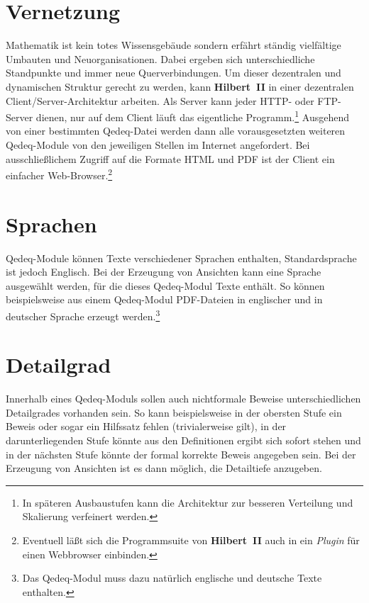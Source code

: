 \documentclass[a4paper,german,10pt,twoside]{book}
\begin{document}
{\section{Vernetzung}
Mathematik ist kein totes Wissensgeb{\"a}ude sondern erf{\"a}hrt st{\"a}ndig vielf{\"a}ltige Umbauten und
Neuorganisationen. Dabei ergeben sich unterschiedliche Standpunkte und immer neue Querverbindungen.
Um dieser dezentralen und dynamischen Struktur gerecht zu werden, kann \textbf{Hilbert~II} in einer
dezentralen Client/Server-Architektur arbeiten. Als Server kann jeder HTTP- oder FTP-Server dienen,
nur auf dem Client l{\"a}uft das eigentliche Programm.\footnote{In sp{\"a}teren Ausbaustufen kann die
Architektur zur besseren Verteilung und Skalierung verfeinert werden.} Ausgehend von einer
bestimmten Qedeq-Datei werden dann alle vorausgesetzten weiteren Qedeq-Module von den jeweiligen
Stellen im Internet angefordert. Bei ausschlie{\ss}lichem Zugriff auf die Formate HTML und PDF ist der
Client ein einfacher Web-Browser.\footnote{Eventuell l{\"a}{\ss}t sich die Programmsuite von
\textbf{Hilbert~II} auch in ein \emph{Plugin} f{\"u}r einen Webbrowser einbinden.}

\section{Sprachen}
Qedeq-Module k{\"o}nnen Texte verschiedener Sprachen enthalten, Standardsprache ist jedoch Englisch.
Bei der Erzeugung von Ansichten kann eine Sprache ausgew{\"a}hlt werden, f{\"u}r die dieses Qedeq-Modul
Texte enth{\"a}lt. So k{\"o}nnen beispielsweise aus einem Qedeq-Modul PDF-Dateien in englischer und in
deutscher Sprache erzeugt werden.\footnote{Das Qedeq-Modul muss dazu nat{\"u}rlich englische und
deutsche Texte enthalten.}

\section{Detailgrad}
Innerhalb eines Qedeq-Moduls sollen auch nichtformale Beweise unterschiedlichen Detailgrades
vorhanden sein. So kann beispielsweise in der obersten Stufe ein Beweis oder sogar ein Hilfssatz
fehlen ({\glqq trivialerweise gilt\grqq}), in der darunterliegenden Stufe k{\"o}nnte {\glqq aus den
Definitionen ergibt sich sofort\grqq} stehen und in der n{\"a}chsten Stufe k{\"o}nnte der formal korrekte
Beweis angegeben sein. Bei der Erzeugung von Ansichten ist es dann m{\"o}glich, die Detailtiefe
anzugeben.

}
\end{document}
